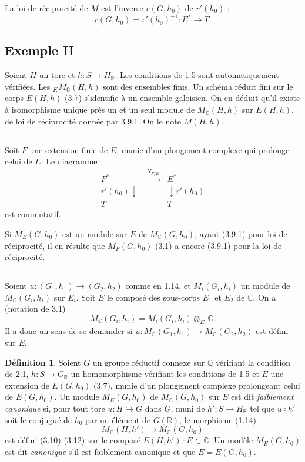\documentclass[11pt]{amsart}
\theoremstyle{plain}
\theoremstyle{definition}
\newtheorem{definition}[theorem]{D\'efinition}
\newcommand{\QQ}{\mathbb{Q}}
\newcommand{\RR}{\mathbb{R}}
\newcommand{\CC}{\mathbb{C}}
\newcommand{\MC}{M_{\mathbb{C}}}
\begin{document}
La loi de r\'eciprocit\'e de $M$ est l'inverse $r(G,h_0)$ de $r'(h_0)$ :
\begin{equation}\label{eq:3.9.1}
r(G,h_0) = r'(h_0)^{-1} : E^* \longrightarrow T.
\end{equation}

\subsection{Exemple II}

Soient $H$ un tore et $h : S \to H_{\RR}$. Les conditions de 1.5 sont automatiquement v\'erifi\'ees. Les ${}_K \MC(H,h)$ sont des ensembles finis. Un sch\'ema r\'eduit fini sur le corps $E(H,h)$ (3.7) s'identifie \`a un ensemble galoisien. On en d\'eduit qu'il existe \`a isomorphisme unique pr\`es un et un seul module de $\MC(H,h)$ sur $E(H,h)$, de loi de r\'eciprocit\'e donn\'ee par 3.9.1. On le note $M(H,h)$.

\subsection{}

Soit $F$ une extension finie de $E$, munie d'un plongement complexe qui prolonge celui de $E$. Le diagramme
\[
\begin{array}{ccc}
F^* & \xrightarrow{\;N_{F/E}\;} & E^* \\
r'(h_0) \downarrow & & \downarrow r'(h_0) \\
T & = & T
\end{array}
\]
est commutatif.

Si $M_E(G,h_0)$ est un module sur $E$ de $\MC(G,h_0)$, ayant (3.9.1) pour loi de r\'eciprocit\'e, il en r\'esulte que $M_F(G,h_0)$ (3.1) a encore (3.9.1) pour la loi de r\'eciprocit\'e.

\subsection{}

Soient $u : (G_1, h_1) \to (G_2, h_2)$ comme en 1.14, et $M_i(G_i, h_i)$ un module de $\MC(G_i, h_i)$ sur $E_i$. Soit $E$ le compos\'e des sous-corps $E_1$ et $E_2$ de $\CC$. On a (notation de 3.1)
\[
\MC(G_i, h_i) = M_i(G_i, h_i) \otimes_{E_i} \CC.
\]
Il a donc un sens de se demander si $u : \MC(G_1, h_1) \to \MC(G_2, h_2)$ est d\'efini sur $E$.

\begin{definition}
Soient $G$ un groupe r\'eductif connexe sur $\QQ$ v\'erifiant la condition de 2.1, $h : S \to G_{\RR}$ un homomorphisme v\'erifiant les conditions de 1.5 et $E$ une extension de $E(G,h_0)$ (3.7), munie d'un plongement complexe prolongeant celui de $E(G,h_0)$. Un module $M_E(G,h_0)$ de $\MC(G,h_0)$ sur $E$ est dit \emph{faiblement canonique} si, pour tout tore $u : H \hookrightarrow G$ dans $G$, muni de $h' : S \to H_{\RR}$ tel que $u \circ h'$ soit le conjugu\'e de $h_0$ par un \'el\'ement de $G(\RR)$, le morphisme (1.14)
\[
\MC(H,h') \longrightarrow \MC(G,h_0)
\]
est d\'efini (3.10) (3.12) sur le compos\'e $E(H,h') \cdot E \subset \CC$. Un mod\`ele $M_E(G,h_0)$ est dit \emph{canonique} s'il est faiblement canonique et que $E = E(G,h_0)$.
\end{definition}
\end{document}
